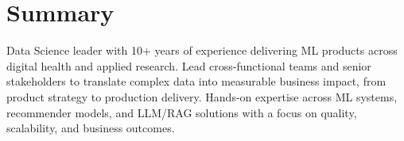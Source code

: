\section{Summary}
\noindent Data Science leader with 10+ years of experience delivering ML products across digital health and applied research. Lead cross-functional teams and senior stakeholders to translate complex data into measurable business impact, from product strategy to production delivery. Hands-on expertise across ML systems, recommender models, and LLM/RAG solutions with a focus on quality, scalability, and business outcomes.

